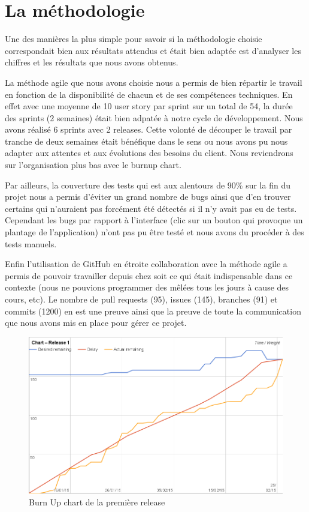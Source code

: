 \section{La méthodologie}
Une des manières la plus simple pour savoir si la méthodologie choisie correspondait bien aux résultats attendus et était bien adaptée est d'analyser les chiffres et les résultats que nous avons obtenus.

La méthode agile \Scrum{} que nous avons choisie nous a permis de bien répartir le travail en fonction de la disponibilité de chacun et de ses compétences techniques. En effet avec une moyenne de 10 user story par sprint sur un total de 54, la durée des sprints (2 semaines) était bien adpatée à notre cycle de développement. Nous avons réalisé 6 sprints avec 2 releases. Cette volonté de découper le travail par tranche de deux semaines était bénéfique dans le sens ou nous avons pu nous adapter aux attentes et aux évolutions des besoins du client. Nous reviendrons sur l'organisation plus bas avec le burnup chart.

Par ailleurs, la couverture des tests qui est aux alentours de 90\% sur la fin du projet nous a permis d'éviter un grand nombre de bugs ainsi que d'en trouver certains qui n'auraient pas forcément été détectés si il n'y avait pas eu de tests. Cependant les bugs par rapport à l'interface (clic sur un bouton qui provoque un plantage de l'application) n'ont pas pu être testé et nous avons du procéder à des tests manuels.

Enfin l'utilisation de GitHub en étroite collaboration avec la méthode agile \Scrum{} a permis de pouvoir travailler depuis chez soit ce qui était indispensable dans ce contexte (nous ne pouvions programmer des mêlées tous les jours à cause des cours, etc). Le nombre de pull requests (95), issues (145), branches (91) et commits (1200) en est une preuve ainsi que la preuve de toute la communication que nous avons mis en place pour gérer ce projet.

\begin{figure}
	\centering
	\includegraphics[width=0.9\linewidth]{screens/release1-chart.png}
	\caption{Burn Up chart de la première release}
	\label{fig:burnupchart-release1}
\end{figure}

